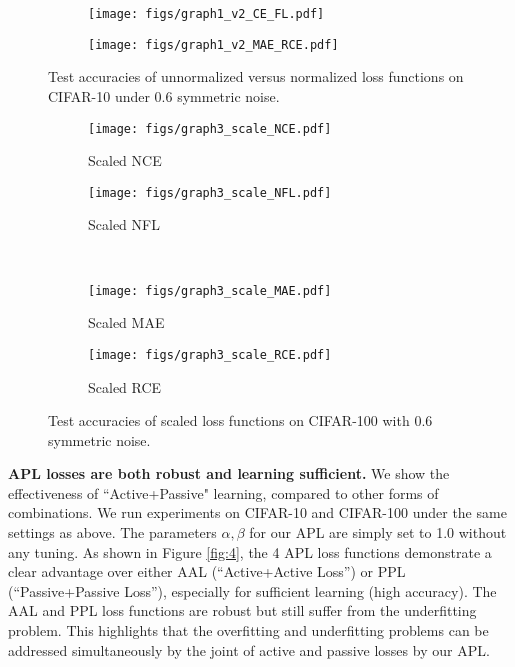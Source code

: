 \documentclass{article}
\begin{document}
\begin{figure}[!t]
	\centering
	\begin{subfigure}{0.48\linewidth}
		\texttt{[image: figs/graph1\_v2\_CE\_FL.pdf]}
		\label{ce_nce}
	\end{subfigure}
	\begin{subfigure}{0.48\linewidth} 
		\texttt{[image: figs/graph1\_v2\_MAE\_RCE.pdf]}
		\label{fl_nfl}
	\end{subfigure}
	\vspace{-0.25 in}
	\caption{Test accuracies of unnormalized versus normalized loss functions on CIFAR-10 under 0.6 symmetric noise. }
	\label{fig:2}
\end{figure}

\begin{figure}[!t]
	\centering
	\begin{subfigure}{0.48\linewidth}
		\texttt{[image: figs/graph3\_scale\_NCE.pdf]}
		\caption{Scaled NCE}
		\label{nce_scale}
	\end{subfigure}
	\begin{subfigure}{0.48\linewidth} 
		\texttt{[image: figs/graph3\_scale\_NFL.pdf]}
		\caption{Scaled NFL}
		\label{nfl_scale}
	\end{subfigure}\\
	\begin{subfigure}{0.48\linewidth}
		\texttt{[image: figs/graph3\_scale\_MAE.pdf]}
		\caption{Scaled MAE}
		\label{mae_scale}
	\end{subfigure}
	\begin{subfigure}{0.48\linewidth} 
		\texttt{[image: figs/graph3\_scale\_RCE.pdf]}
		\caption{Scaled RCE}
		\label{rce_scale}
	\end{subfigure}
	\vspace{-0.1 in}
	\caption{Test accuracies of scaled loss functions on CIFAR-100 with 0.6 symmetric noise.}
 	\vspace{-0.15 in}
	\label{fig:3}
\end{figure}


\noindent\textbf{APL losses are both robust and learning sufficient.}
We show the effectiveness of ``Active+Passive" learning, compared to other forms of combinations. We run experiments on CIFAR-10 and CIFAR-100 under the same settings as above. The parameters $\alpha, \beta$ for our APL are simply set to 1.0 without any tuning.
As shown in Figure \ref{fig:4}, the 4 APL loss functions demonstrate a clear advantage over either AAL (``Active+Active Loss'') or PPL (``Passive+Passive Loss''), especially for sufficient learning (high accuracy).
The AAL and PPL loss functions are robust but still suffer from the underfitting problem. This highlights that the overfitting and underfitting problems can be addressed simultaneously by the joint of active and passive losses by our APL.
\end{document}
